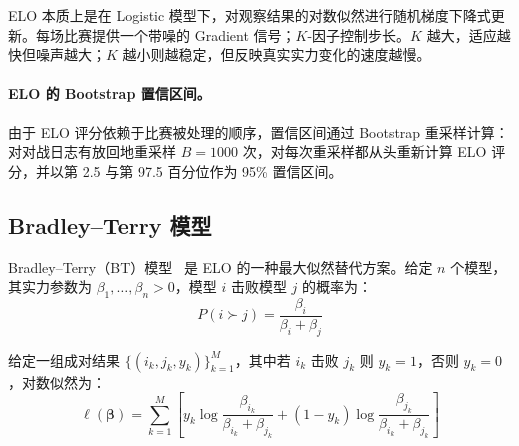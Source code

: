 \begin{intuitionbox}[ELO 的直觉]
ELO 本质上是在 Logistic 模型下，对观察结果的对数似然进行随机梯度下降式更新。每场比赛提供一个带噪的 Gradient 信号；$K$-因子控制步长。$K$ 越大，适应越快但噪声越大；$K$ 越小则越稳定，但反映真实实力变化的速度越慢。
\end{intuitionbox}

\paragraph{ELO 的 Bootstrap 置信区间。}
\label{bootstrap-confidence-intervals-for-elo.}

由于 ELO 评分依赖于比赛被处理的顺序，置信区间通过 Bootstrap 重采样计算：对对战日志有放回地重采样 $B = 1000$ 次，对每次重采样都从头重新计算 ELO 评分，并以第 2.5 与第 97.5 百分位作为 95\% 置信区间。

\subsection{Bradley--Terry 模型}
\label{bradleyterry-model}

Bradley--Terry（BT）模型~\cite{bradley1952rank} 是 ELO 的一种最大似然替代方案。给定 $n$ 个模型，其实力参数为 $\beta_1, \ldots, \beta_n > 0$，模型 $i$ 击败模型 $j$ 的概率为：
\begin{equation}
    P(i \succ j) = \frac{\beta_i}{\beta_i + \beta_j}
\end{equation}

给定一组成对结果 $\{(i_k, j_k, y_k)\}_{k=1}^{M}$，其中若 $i_k$ 击败 $j_k$ 则 $y_k = 1$，否则 $y_k = 0$，对数似然为：
\begin{equation}
    \ell(\boldsymbol{\beta}) = \sum_{k=1}^{M} \left[ y_k \log \frac{\beta_{i_k}}{\beta_{i_k} + \beta_{j_k}} + (1-y_k) \log \frac{\beta_{j_k}}{\beta_{i_k} + \beta_{j_k}} \right]
\end{equation}

